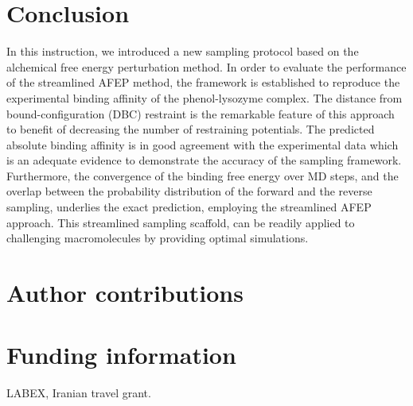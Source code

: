 \documentclass[9pt,tutorial]{livecoms}
\begin{document}
\section{Conclusion}
In this instruction, we introduced a new sampling protocol based on the alchemical free energy perturbation method. In order to evaluate the performance of the streamlined AFEP method, the framework is established to reproduce the experimental binding affinity of the phenol-lysozyme complex. The distance from bound-configuration (DBC) restraint is the remarkable feature of this approach to benefit of decreasing the number of restraining potentials. The predicted absolute binding affinity is in good agreement with the experimental data which is an adequate evidence to demonstrate the accuracy of the sampling framework. Furthermore, the convergence of the binding free energy over MD steps, and the overlap between the probability distribution of the forward and the reverse sampling, underlies the exact prediction, employing the streamlined AFEP approach. This streamlined sampling scaffold, can be readily applied to challenging macromolecules by providing optimal simulations.

\section{Author contributions}

\section{Funding information}

LABEX, Iranian travel grant.

% 

\end{document}
